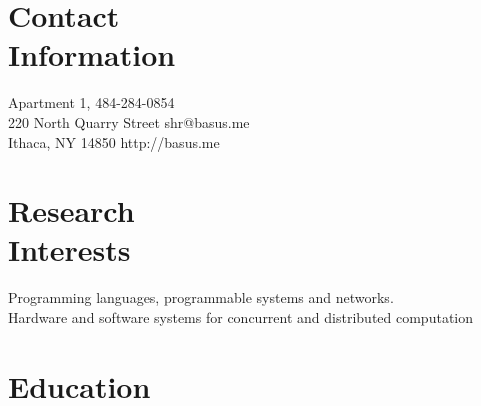 \documentclass[margin,line]{resume}
\begin{document}
\begin{resume}


    \section{\mysidestyle Contact\\Information}%

    Apartment 1,                            \hfill 484-284-0854            \\
    220 North Quarry Street                  \hfill shr@basus.me    \\
    Ithaca, NY 14850                         \hfill http://basus.me


    \section{\mysidestyle Research\\Interests}

    Programming languages, programmable systems and networks. \\
    Hardware and software systems for concurrent and distributed computation 

    \section{\mysidestyle Education}


\end{resume}
\end{document}
